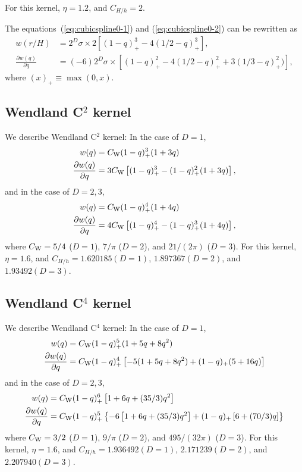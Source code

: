 \documentclass[fleqn,dvipdfmx]{article}
\begin{document}
For this kernel, $\eta=1.2$, and $C_{H/h}=2$.

The equations~(\ref{eq:cubicspline0-1}) and (\ref{eq:cubicspline0-2})
can be rewritten as
\begin{align}
  w(r/H) &= 2^D \sigma \times 2 \left[ (1-q)^3_+ - 4 (1/2 - q)^3_+
    \right], \\
  \frac{\partial w(q)}{\partial q} &= (-6)2^D \sigma \times \left[
    (1-q)^2_+ - 4(1/2-q)^2_+ + 3(1/3-q)^2_+) \right],
\end{align}
where $(x)_+ \equiv \max(0, x)$.

\subsection{Wendland C$^2$ kernel}

We describe Wendland C$^2$ kernel: In the case of $D = 1$,
\begin{align}
  w(q) &= C_{\rm W} (1-q)_+^3 (1+3q) \\ \frac{\partial w(q)}{\partial
    q} &= 3 C_{\rm W} \left[(1-q)^3_+ - (1-q)^2_+ (1+3q) \right],
\end{align}
and in the case of $D = 2, 3$,
\begin{align}
  w(q) &= C_{\rm W} (1-q)_+^4 (1+4q) \\ \frac{\partial w(q)}{\partial
    q} &= 4 C_{\rm W} \left[(1-q)^4_+ - (1-q)^3_+ (1+4q) \right],
\end{align}
where $C_{\rm W}=5/4$ ($D=1$), $7/\pi$ ($D=2$), and $21/(2\pi)$
($D=3$). For this kernel, $\eta=1.6$, and $C_{H/h}=1.620185(D=1)$,
$1.897367(D=2)$, and $1.93492(D=3)$.

\subsection{Wendland C$^4$ kernel}

We describe Wendland C$^4$ kernel: In the case of $D = 1$,
\begin{align}
  w(q) &= C_{\rm W} (1-q)_+^5 (1+5q+8q^2) \\
  \frac{\partial w(q)}{\partial q} &= C_{\rm W} (1-q)_+^4 \left[
    -5(1+5q+8q^2) + (1-q)_+ (5+16q) \right]
\end{align}
and in the case of $D = 2, 3$,
\begin{align}
  w(q) &= C_{\rm W} (1-q)_+^6 \left[ 1+6q+(35/3)q^2 \right] \\
  \frac{\partial w(q)}{\partial q} &= C_{\rm W} (1-q)_+^5 \left\{-6
  \left[ 1+6q+(35/3)q^2 \right] + (1-q)_+ \left[ 6+(70/3)q \right]
  \right\}
\end{align}
where $C_{\rm W}=3/2$ ($D=1$), $9/\pi$ ($D=2$), and $495/(32\pi)$
($D=3$). For this kernel, $\eta=1.6$, and $C_{H/h}=1.936492(D=1)$,
$2.171239(D=2)$, and $2.207940(D=3)$.
\end{document}
